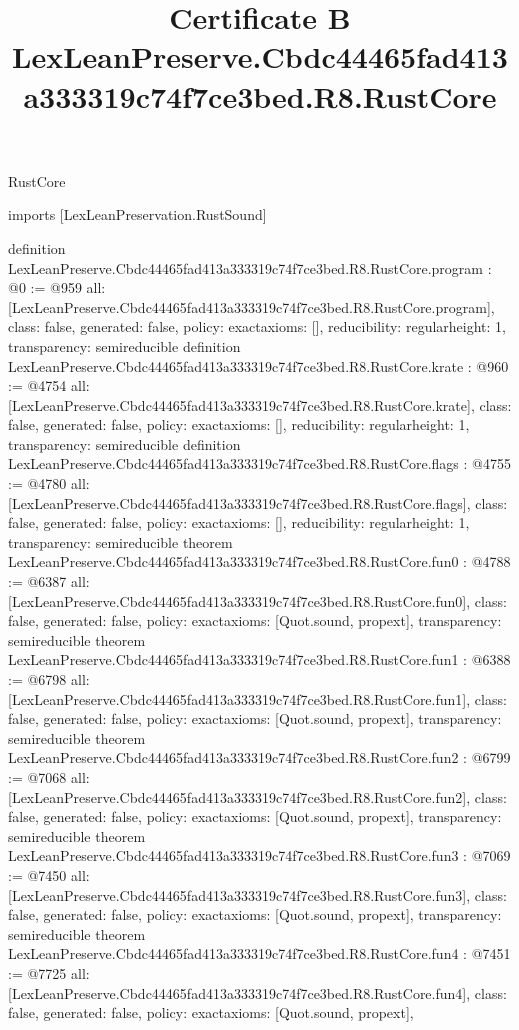 \begin{lexlean}{RustCore}
\title{Certificate B LexLeanPreserve.Cbdc44465fad413a333319c74f7ce3bed.R8.RustCore}
\begin{coremodule}
imports [LexLeanPreservation.RustSound]

definition LexLeanPreserve.Cbdc44465fad413a333319c74f7ce3bed.R8.RustCore.program : @0 := @959 {
  all: [LexLeanPreserve.Cbdc44465fad413a333319c74f7ce3bed.R8.RustCore.program],
  class: false,
  generated: false,
  policy: exact{axioms: []},
  reducibility: regular{height: 1},
  transparency: semireducible
}
definition LexLeanPreserve.Cbdc44465fad413a333319c74f7ce3bed.R8.RustCore.krate : @960 := @4754 {
  all: [LexLeanPreserve.Cbdc44465fad413a333319c74f7ce3bed.R8.RustCore.krate],
  class: false,
  generated: false,
  policy: exact{axioms: []},
  reducibility: regular{height: 1},
  transparency: semireducible
}
definition LexLeanPreserve.Cbdc44465fad413a333319c74f7ce3bed.R8.RustCore.flags : @4755 := @4780 {
  all: [LexLeanPreserve.Cbdc44465fad413a333319c74f7ce3bed.R8.RustCore.flags],
  class: false,
  generated: false,
  policy: exact{axioms: []},
  reducibility: regular{height: 1},
  transparency: semireducible
}
theorem LexLeanPreserve.Cbdc44465fad413a333319c74f7ce3bed.R8.RustCore.fun0 : @4788 := @6387 {
  all: [LexLeanPreserve.Cbdc44465fad413a333319c74f7ce3bed.R8.RustCore.fun0],
  class: false,
  generated: false,
  policy: exact{axioms: [Quot.sound, propext]},
  transparency: semireducible
}
theorem LexLeanPreserve.Cbdc44465fad413a333319c74f7ce3bed.R8.RustCore.fun1 : @6388 := @6798 {
  all: [LexLeanPreserve.Cbdc44465fad413a333319c74f7ce3bed.R8.RustCore.fun1],
  class: false,
  generated: false,
  policy: exact{axioms: [Quot.sound, propext]},
  transparency: semireducible
}
theorem LexLeanPreserve.Cbdc44465fad413a333319c74f7ce3bed.R8.RustCore.fun2 : @6799 := @7068 {
  all: [LexLeanPreserve.Cbdc44465fad413a333319c74f7ce3bed.R8.RustCore.fun2],
  class: false,
  generated: false,
  policy: exact{axioms: [Quot.sound, propext]},
  transparency: semireducible
}
theorem LexLeanPreserve.Cbdc44465fad413a333319c74f7ce3bed.R8.RustCore.fun3 : @7069 := @7450 {
  all: [LexLeanPreserve.Cbdc44465fad413a333319c74f7ce3bed.R8.RustCore.fun3],
  class: false,
  generated: false,
  policy: exact{axioms: [Quot.sound, propext]},
  transparency: semireducible
}
theorem LexLeanPreserve.Cbdc44465fad413a333319c74f7ce3bed.R8.RustCore.fun4 : @7451 := @7725 {
  all: [LexLeanPreserve.Cbdc44465fad413a333319c74f7ce3bed.R8.RustCore.fun4],
  class: false,
  generated: false,
  policy: exact{axioms: [Quot.sound, propext]},
}
\end{coremodule}
\end{lexlean}
